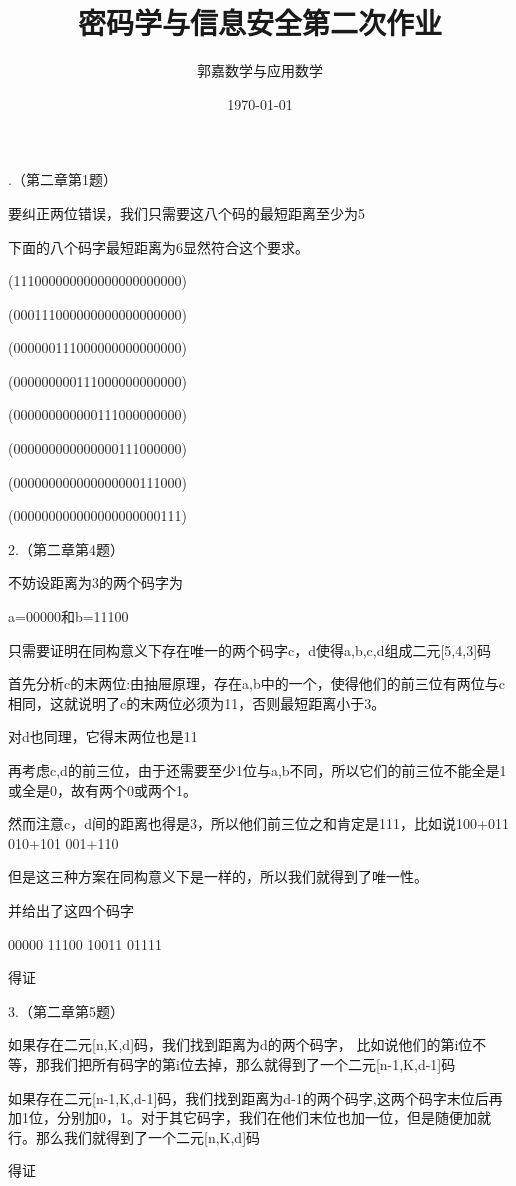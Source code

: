 \documentclass{ctexart}
\title{密码学与信息安全第二次作业}
\author{郭嘉\quad17345019\quad 数学与应用数学}
\date{\today}
\begin{document}
	.（第二章第1题）
	
	要纠正两位错误，我们只需要这八个码的最短距离至少为5
	
	下面的八个码字最短距离为6显然符合这个要求。
	
	(111000000000000000000000)
	
	(000111000000000000000000)
	
	(000000111000000000000000)
	
	(000000000111000000000000)
	
	(000000000000111000000000)
	
	(000000000000000111000000)
	
	(000000000000000000111000)
	
	(000000000000000000000111)
	
	2.（第二章第4题）
	
	不妨设距离为3的两个码字为
	
	a=00000和b=11100
	
	只需要证明在同构意义下存在唯一的两个码字c，d使得a,b,c,d组成二元[5,4,3]码
	
	首先分析c的末两位:由抽屉原理，存在a,b中的一个，使得他们的前三位有两位与c相同，这就说明了c的末两位必须为11，否则最短距离小于3。
	
	对d也同理，它得末两位也是11
	
	再考虑c,d的前三位，由于还需要至少1位与a,b不同，所以它们的前三位不能全是1或全是0，故有两个0或两个1。
	
	然而注意c，d间的距离也得是3，所以他们前三位之和肯定是111，比如说100+011 010+101 001+110
	
	但是这三种方案在同构意义下是一样的，所以我们就得到了唯一性。
	
	并给出了这四个码字
	
    00000 11100 10011 01111
    
    得证
    
     
	3.（第二章第5题）
	
	如果存在二元[n,K,d]码，我们找到距离为d的两个码字，
	比如说他们的第i位不等，那我们把所有码字的第i位去掉，那么就得到了一个二元[n-1,K,d-1]码
	
	如果存在二元[n-1,K,d-1]码，我们找到距离为d-1的两个码字,这两个码字末位后再加1位，分别加0，1。对于其它码字，我们在他们末位也加一位，但是随便加就行。那么我们就得到了一个二元[n,K,d]码
	
	得证
	
\end{document}
